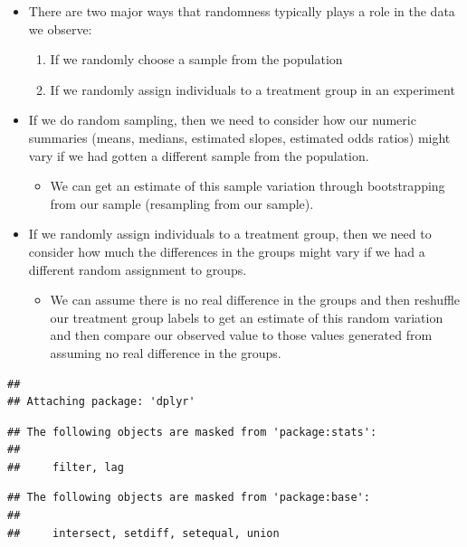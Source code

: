 \documentclass[
]{book}
\providecommand{\tightlist}{%
  \setlength{\itemsep}{0pt}\setlength{\parskip}{0pt}}
\begin{document}
\begin{itemize}
\item
  There are two major ways that randomness typically plays a role in the data we observe:

  \begin{enumerate}
  \def\labelenumi{\arabic{enumi}.}
  \tightlist
  \item
    If we randomly choose a sample from the population
  \item
    If we randomly assign individuals to a treatment group in an experiment
  \end{enumerate}
\item
  If we do random sampling, then we need to consider how our numeric summaries (means, medians, estimated slopes, estimated odds ratios) might vary if we had gotten a different sample from the population.

  \begin{itemize}
  \tightlist
  \item
    We can get an estimate of this sample variation through bootstrapping from our sample (resampling from our sample).
  \end{itemize}
\item
  If we randomly assign individuals to a treatment group, then we need to consider how much the differences in the groups might vary if we had a different random assignment to groups.

  \begin{itemize}
  \tightlist
  \item
    We can assume there is no real difference in the groups and then reshuffle our treatment group labels to get an estimate of this random variation and then compare our observed value to those values generated from assuming no real difference in the groups.
  \end{itemize}
\end{itemize}

\begin{verbatim}
## 
## Attaching package: 'dplyr'
\end{verbatim}

\begin{verbatim}
## The following objects are masked from 'package:stats':
## 
##     filter, lag
\end{verbatim}

\begin{verbatim}
## The following objects are masked from 'package:base':
## 
##     intersect, setdiff, setequal, union
\end{verbatim}
\end{document}
